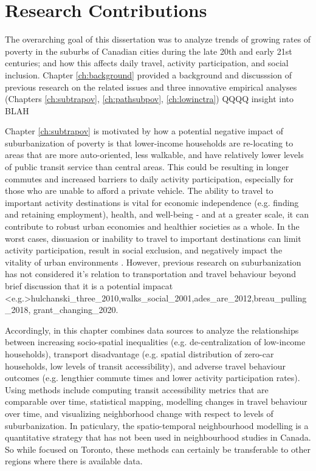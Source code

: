 
\section{Research Contributions}

The overarching goal of this dissertation was to analyze trends of growing rates of poverty in the suburbs of Canadian cities during the late 20th and early 21st centuries; and how this affects daily travel, activity participation, and social inclusion. Chapter \ref{ch:background} provided a background and discusssion of previous research on the related issues and three innovative empirical analyses (Chapters \ref{ch:subtrapov}, \ref{ch:pathsubpov}, \ref{ch:lowinctra}) QQQQ insight into BLAH

Chapter \ref{ch:subtrapov} is motivated by how a potential negative impact of suburbanization of poverty is that lower-income households are re-locating to areas that are more auto-oriented, less walkable, and have relatively lower levels of public transit service than central areas. This could be resulting in longer commutes and increased barriers to daily activity participation, especially for those who are unable to afford a private vehicle. The ability to travel to important activity destinations is vital for economic independence (e.g. finding and retaining employment), health, and well-being - and at a greater scale, it can contribute to robust urban economies and healthier societies as a whole. In the worst cases, dissuasion or inability to travel to important destinations can limit activity participation, result in social exclusion, and negatively impact the vitality of urban environments \cite{lucas_transport_2012,martens_transport_2016}. However, previous research on suburbanization has not considered it's relation to transportation and travel behaviour beyond brief discussion that it is a potential impacat \shortcite<e.g.>{hulchanski_three_2010,walks_social_2001,ades_are_2012,breau_pulling_2018, grant_changing_2020}. 

Accordingly, in this chapter combines data sources to analyze the relationships between increasing socio-spatial inequalities (e.g. de-centralization of low-income households), transport disadvantage (e.g. spatial distribution of zero-car households, low levels of transit accessibility), and adverse travel behaviour outcomes (e.g. lengthier commute times and lower activity participation rates). Using methods include computing transit accessibility metrics that are comparable over time, statistical mapping, modelling changes in travel behaviour over time, and visualizing neighborhood change with respect to levels of suburbanization. In paticulary, the spatio-temporal neighbourhood modelling is a quantitative strategy that has not been used in neighbourhood studies in Canada. So while focused on Toronto, these methods can certainly be transferable to other regions where there is available data.

